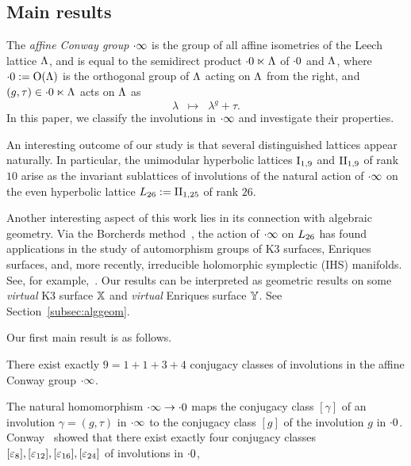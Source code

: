 \documentclass{amsart} %
\begin{document}
\subsection{Main results}
%
The \emph{affine Conway group} $\cdot \infty$ is the group of 
all affine isometries of the Leech lattice $\Lambda$,
and is equal to the semidirect product $\cdot 0 \ltimes \Lambda$
of $\cdot 0$ and $\Lambda$,
where $\cdot 0:=\mathord{\mathrm{O}}(\Lambda)$ is the orthogonal group of $\Lambda$
acting on $\Lambda$ from the right, and 
$(g, \tau)\in \cdot 0 \ltimes \Lambda$ acts on $\Lambda$ as
\[
\lambda\;\;\mapsto\;\; \lambda^g+\tau.
\]
In this paper,
we classify the involutions in $\cdot \infty$ and investigate their properties. 
\par
An interesting outcome of our study is that 
several distinguished lattices appear naturally. 
In particular, the unimodular hyperbolic lattices $\mathrm{I}_{1, 9}$ and $\mathrm{II}_{1, 9}$ of rank $10$
arise as the invariant sublattices of involutions of the natural action of $\cdot \infty$ on 
the even hyperbolic lattice $L_{26}:=\mathrm{II}_{1, 25}$ of rank $26$.                                                                                                                                                                                                                                                                                                    
\par
Another interesting aspect of this work lies in its connection with algebraic geometry. 
Via the Borcherds method~\cite{MR913200, MR1654763},
the action of $\cdot \infty$ on $L_{26}$
has found applications in the study of automorphism groups of K3 surfaces, 
Enriques surfaces, and, more recently, irreducible holomorphic symplectic (IHS) manifolds.
 See, for example,~\cite{MR4931809}.
 Our results can be interpreted as geometric results 
 on some \emph{virtual} K3 surface $\mathord{\mathbb{X}}$ and \emph{virtual} Enriques surface $\mathord{\mathbb{Y}}$.
 See Section~\ref{subsec:alggeom}.
\par
Our first main result is as follows.
%
\begin{theorem}\label{thm:main1}
There exist exactly 
$9=1+1+3+4$
conjugacy classes of involutions in the affine Conway group $\cdot \infty$.
\end{theorem}
%
The natural homomorphism $\cdot \infty \to \cdot 0$ maps
the conjugacy class $[\gamma]$ of an involution $\gamma=(g, \tau)$
in $\cdot \infty$ to the conjugacy class $[g]$ of the involution $g$ in $\cdot 0$. 
Conway~\cite[Chapter 10,~Section 3.7]{theCSbook}
showed that there exist exactly four conjugacy classes
$[\varepsilon_8], [\varepsilon_{12}], [\varepsilon_{16}], [\varepsilon_{24}]$ of involutions in $\cdot 0$,
\end{document}
